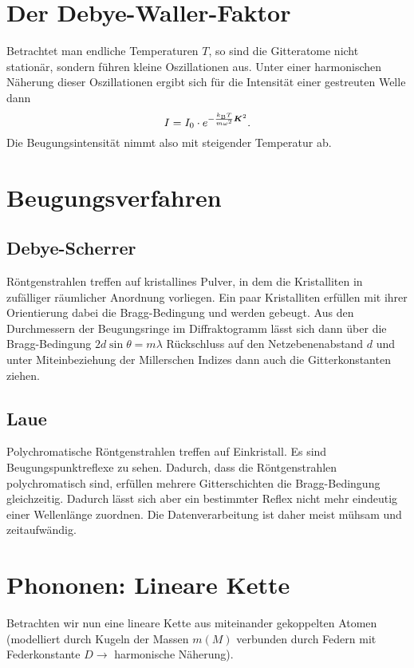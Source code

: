 \section{Der Debye-Waller-Faktor}
Betrachtet man endliche Temperaturen $T$, so sind die Gitteratome nicht stationär, sondern führen kleine Oszillationen aus.
Unter einer harmonischen Näherung dieser Oszillationen ergibt sich für die Intensität einer gestreuten Welle dann
\begin{equation*}
	I = I_0\cdot e^{-\frac{k_\text{B}T}{m\omega^2}\boldsymbol{K}^2}.
\end{equation*}
Die Beugungsintensität nimmt also mit steigender Temperatur ab.

\section{Beugungsverfahren}
\subsection{Debye-Scherrer}
Röntgenstrahlen treffen auf kristallines Pulver, in dem die Kristalliten in zufälliger räumlicher Anordnung vorliegen.
Ein paar Kristalliten erfüllen mit ihrer Orientierung dabei die Bragg-Bedingung und werden gebeugt.
Aus den Durchmessern der Beugungsringe im Diffraktogramm lässt sich dann über die Bragg-Bedingung $2d\sin\theta = m\lambda$ Rückschluss auf den Netzebenenabstand $d$ und unter Miteinbeziehung der Millerschen Indizes dann auch die Gitterkonstanten ziehen.

\subsection{Laue}
Polychromatische Röntgenstrahlen treffen auf Einkristall.
Es sind Beugungspunktreflexe zu sehen.
Dadurch, dass die Röntgenstrahlen polychromatisch sind, erfüllen mehrere Gitterschichten die Bragg-Bedingung gleichzeitig.
Dadurch lässt sich aber ein bestimmter Reflex nicht mehr eindeutig einer Wellenlänge zuordnen.
Die Datenverarbeitung ist daher meist mühsam und zeitaufwändig.

\section{Phononen: Lineare Kette}
Betrachten wir nun eine lineare Kette aus miteinander gekoppelten Atomen (modelliert durch Kugeln der Massen $m(M)$ verbunden durch Federn mit Federkonstante $D\rightarrow$ harmonische Näherung).

